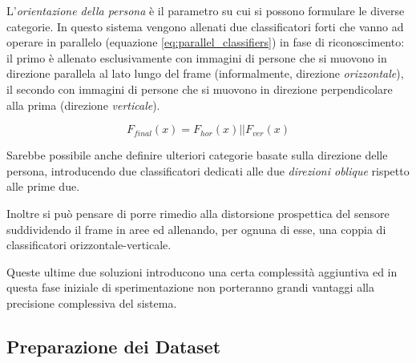                 L'\emph{orientazione della persona} è il parametro su cui si possono formulare le diverse categorie.
                In questo sistema vengono allenati due classificatori forti che vanno ad operare in parallelo (equazione \ref{eq:parallel_classifiers}) in fase di riconoscimento: il primo è allenato esclusivamente con immagini di persone che si muovono in direzione parallela al lato lungo del frame (informalmente, direzione \emph{orizzontale}), il secondo con immagini di persone che si muovono in direzione perpendicolare alla prima (direzione \emph{verticale}).

                \begin{equation}
                    \label{eq:parallel_classifiers}
                    F_{final}(x) = F_{hor}(x) || F_{ver}(x)
                \end{equation}

                Sarebbe possibile anche definire ulteriori categorie basate sulla direzione delle persona, introducendo due classificatori dedicati alle due \emph{direzioni oblique} rispetto alle prime due.

                Inoltre si può pensare di porre rimedio alla distorsione prospettica del sensore suddividendo il frame in aree ed allenando, per ognuna di esse, una coppia di classificatori orizzontale-verticale.
                
                Queste ultime due soluzioni introducono una certa complessità aggiuntiva ed in questa fase iniziale di sperimentazione non porteranno grandi vantaggi alla precisione complessiva del sistema.

        \subsection{Preparazione dei Dataset}
        \label{sub:datasets_setup}
